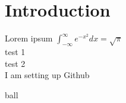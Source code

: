 \section{Introduction}\label{intro}
Lorem ipsum
$\int_{-\infty}^\infty e^{-x^2}dx = \sqrt\pi$\\
test 1\\
test 2\\
I am setting up Github

ball
